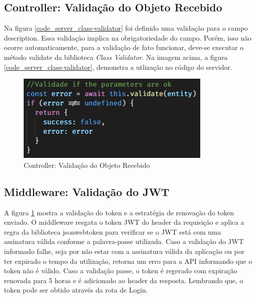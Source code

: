 \subsection{Controller: Validação do Objeto Recebido}

Na figura \ref{code_server_class-validator} foi definido uma validação para o campo description. Essa validação implica na obrigatoriedade do campo. Porém, isso não ocorre automaticamente, para a validação de fato funcionar, deve-se executar o método validate da biblioteca \textit{Class Validator}. Na imagem acima, a figura \ref{code_server_class-validator}, demonstra a utlização no código do servidor.

\begin{figure}[htb]
	\caption{\label{code_server_class-validate}Controller: Validação do Objeto Recebido}
	\begin{center}
		\includegraphics[scale=1.60]{./Figuras/code/server/controller-class-validator.png}
	\end{center}
\end{figure}




\subsection{Middleware: Validação do JWT}


A figura \ref{code_server_class-validate} mostra a validação do token e a estratégia de renovação do token enviado. O middleware resgata o token JWT do header da requisição e aplica a regra da biblioteca jsonwebtoken para verificar se o JWT está com uma assinatura válida conforme a palavra-passe utilizada.
Caso a validação do JWT informado falhe, seja por não estar com a assinatura válida da aplicação ou por ter expirado o tempo da utilização, retorna um erro para a API informando que o token não é válido.
Caso a validação passe, o token é regerado com expiração renovada para 5 horas e é adicionado ao header da resposta.
Lembrando que, o token pode ser obtido através da rota de Login.

